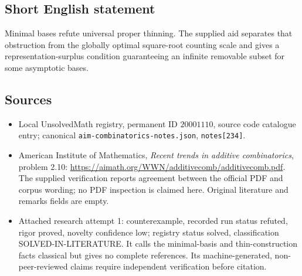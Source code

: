 \documentclass[11pt]{article}
\begin{document}
\subsection{Short English statement}
Minimal bases refute universal proper thinning. The supplied aid separates that obstruction from the globally optimal square-root counting scale and gives a representation-surplus condition guaranteeing an infinite removable subset for some asymptotic bases.
\subsection{Sources}
\begin{itemize}
\item Local UnsolvedMath registry, permanent ID $20001110$, source code catalogue entry; canonical \texttt{aim-combinatorics-notes.json}, \texttt{notes[234]}.
\item American Institute of Mathematics, \emph{Recent trends in additive combinatorics}, problem 2.10: \url{https://aimath.org/WWN/additivecomb/additivecomb.pdf}. The supplied verification reports agreement between the official PDF and corpus wording; no PDF inspection is claimed here. Original literature and remarks fields are empty.
\item Attached research attempt 1: counterexample, recorded run status refuted, rigor proved, novelty confidence low; registry status solved, classification SOLVED-IN-LITERATURE. It calls the minimal-basis and thin-construction facts classical but gives no complete references. Its machine-generated, non-peer-reviewed claims require independent verification before citation.
\end{itemize}
\end{document}

